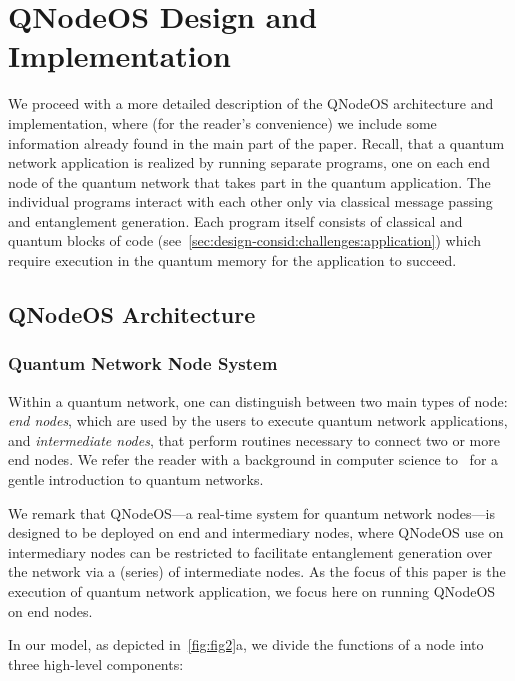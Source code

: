 \section{QNodeOS Design and Implementation}
\label{sec:design}

We proceed with a more detailed description of the \ac{QNodeOS} architecture and implementation, where (for the reader's convenience) we include some information already found in the main part of the paper. Recall, that a quantum network application is realized by running separate programs, one on each end node of the quantum network that takes part in the quantum application. The individual programs interact with each other only via classical message passing and entanglement generation. Each program itself consists of classical and quantum blocks of code (see~\cref{sec:design-consid:challenges:application}) which require execution in the quantum memory for the application to succeed.

\subsection{QNodeOS Architecture}
\label{sec:appendix-arch}

\subsubsection{Quantum Network Node System}
\label{sec:appendix-arch-node_system}

Within a quantum network, one can distinguish between two main types of node: \emph{end nodes}, which are used by the users to execute quantum network applications, and \emph{intermediate nodes}, that perform routines necessary to connect two or more end nodes. We refer the reader with a background in computer science to~\cite{vanMeter_book} for a gentle introduction to quantum networks. 

We remark that \ac{QNodeOS}---a real-time system for quantum network nodes---is designed to be deployed on end and intermediary nodes, where \ac{QNodeOS} use on intermediary nodes can be restricted to facilitate entanglement generation over the network via a (series) of intermediate nodes. As the focus of this paper is the execution of quantum network application, we focus here on running \ac{QNodeOS} on end nodes.

In our model, as depicted in~\cref{fig:fig2}a, we divide the functions of a node into three high-level components:

